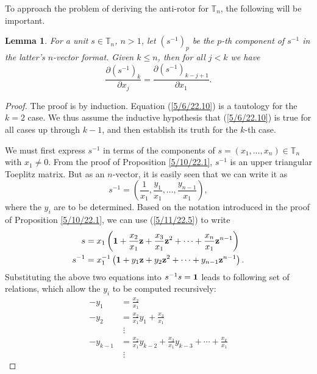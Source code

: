 \documentclass{amsart}
\numberwithin{equation}{section}
\newtheorem{lemma}[theorem]{Lemma}
\theoremstyle{definition}
\numberwithin{theorem}{section}
\begin{document}
To approach the problem of deriving the anti-rotor for $\mathbb{T}_n$, the following will be important.

\begin{lemma} \label{5/7/22.15} For a unit $s\in \mathbb{T}_n$,  $n>1$, let $\left( s^{-1} \right)_p$ be the $p$-th component of $s^{-1}$ in the latter's $n$-vector format.  Given $k\le n$, then for all $j<k$ we have \begin{equation}\label{5/6/22.10} \frac{\partial \left( s^{-1} \right)_k}{\partial x_j} = \frac{\partial \left( s^{-1} \right)_{k-j+1}}{\partial x_1}.\end{equation}
\end{lemma}

\begin{proof} The proof is by induction. Equation (\ref{5/6/22.10}) is a tautology for the $k=2$ case.  We thus assume the inductive hypothesis that (\ref{5/6/22.10}) is true  for all cases up through $k-1$, and then establish its truth for the $k$-th case.


We must first express $s^{-1}$ in terms of the components of  $s=(x_1,\dots,x_n)\in \mathbb{T}_n$ with $x_1\ne 0$.   From the proof of Proposition \ref{5/10/22.1},  $s^{-1}$ is an upper triangular Toeplitz matrix.  But as an $n$-vector, it is easily seen that we can write it as  \begin{equation}\label{5/9/22.1} s^{-1} = (\frac{1}{x_1}, \frac{y_1}{x_1},\dots, \frac{y_{n-1}}{x_1}),\end{equation} where the $y_i$ are to be determined. 
Based on the notation introduced in the proof of Proposition \ref{5/10/22.1}, we can use (\ref{5/11/22.5}) to write 
\begin{align}\nonumber s &= x_1 \left({\bf 1} + \frac{x_2}{x_1} {\bf z} + \frac{x_3}{x_1} {\bf z}^2 + \cdots + \frac{x_n}{x_1} {\bf z}^{n-1}\right)\\ s^{-1} &= x_1^{-1} \left({\bf 1} + y_1 {\bf z} + y_2 {\bf z}^2 + \cdots + y_{n-1} {\bf z}^{n-1}\right).  \label{5/18/22.10} \end{align}  Substituting the above two equations into $s^{-1} s = {\bf 1}$ leads to following set of relations, which allow the $y_i$ to be computed recursively:
\begin{align} -y_1 &= \frac{x_2}{x_1} \nonumber \\ -y_2 &= \frac{x_2}{x_1}y_1 + \frac{x_3}{x_1} \nonumber \\ &\;\vdots \nonumber \\ -y_{k-1} &= \frac{x_2}{x_1} y_{k-2} + \frac{x_3}{x_1} y_{k-3} + \cdots + \frac{x_k}{x_1} \label{5/7/22.1} \\ &\;\vdots \nonumber \end{align} 
 

\end{proof}
\end{document}
